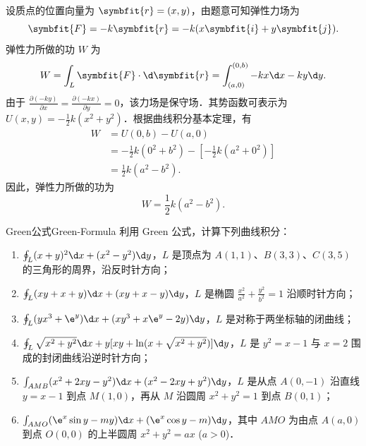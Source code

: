 \begin{solution}
    设质点的位置向量为 $\symbfit{r} = (x, y)$，由题意可知弹性力场为
    \begin{equation}
        \symbfit{F} = -k \symbfit{r} = -k(x \symbfit{i} + y \symbfit{j}).
    \end{equation}
    弹性力所做的功 $W$ 为
    \begin{equation}
        W = \int_L \symbfit{F} \cdot \d \symbfit{r} = \int_{(a, 0)}^{(0, b)} -kx \d x - ky \d y.
    \end{equation}
    由于 $\frac{\partial (-ky)}{\partial x} = \frac{\partial (-kx)}{\partial y} = 0$，该力场是保守场．其势函数可表示为 $U(x, y) = -\frac{1}{2}k(x^2 + y^2)$．根据曲线积分基本定理，有
    \begin{equation}
        \begin{aligned}
            W & = U(0, b) - U(a, 0)                                                  \\
              & = -\frac{1}{2}k(0^2 + b^2) - \left[ -\frac{1}{2}k(a^2 + 0^2) \right] \\
              & = \frac{1}{2}k(a^2 - b^2).
        \end{aligned}
    \end{equation}
    因此，弹性力所做的功为
    \begin{equation}
        \boxed{W = \frac{1}{2}k(a^2 - b^2)}.
    \end{equation}
\end{solution}

\begin{problem}{Green公式}{Green-Formula}
    利用 Green 公式，计算下列曲线积分：
    \begin{enumerate}
        \item $\oint_L (x+y)^2 \d x + (x^2 - y^2) \d y$，$L$ 是顶点为 $A(1,1)$、$B(3,3)$、$C(3,5)$ 的三角形的周界，沿反时针方向；
        \item $\oint_L (xy+x+y) \d x + (xy+x-y) \d y$，$L$ 是椭圆 $\frac{x^2}{a^2} + \frac{y^2}{b^2} = 1$ 沿顺时针方向；
        \item $\oint_L (yx^3 + \e^y) \d x + (xy^3 + x\e^y - 2y) \d y$，$L$ 是对称于两坐标轴的闭曲线；
        \item $\oint_L \sqrt{x^2+y^2} \d x + y[xy + \ln(x + \sqrt{x^2+y^2})] \d y$，$L$ 是 $y^2 = x-1$ 与 $x=2$ 围成的封闭曲线沿逆时针方向；
        \item $\int_{AMB} (x^2+2xy-y^2) \d x + (x^2-2xy+y^2) \d y$，$L$ 是从点 $A(0,-1)$ 沿直线 $y=x-1$ 到点 $M(1,0)$，再从 $M$ 沿圆周 $x^2+y^2=1$ 到点 $B(0,1)$；
        \item $\int_{AMO} (\e^x \sin y - my) \d x + (\e^x \cos y - m) \d y$，其中 $AMO$ 为由点 $A(a,0)$ 到点 $O(0,0)$ 的上半圆周 $x^2+y^2=ax$ ($a > 0$)．
    \end{enumerate}
\end{problem}

